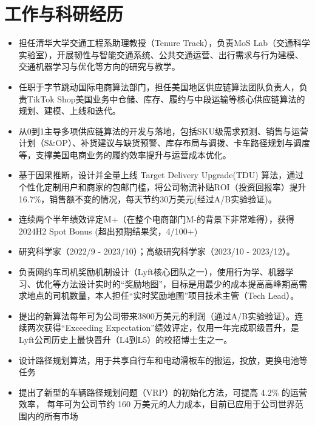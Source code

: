 
\section{工作与科研经历}
\begin{itemize}[parsep=0.5ex]
  \item 担任清华大学交通工程系助理教授（Tenure Track），负责MoS Lab（交通科学实验室），开展韧性与智能交通系统、公共交通运营、出行需求与行为建模、交通机器学习与优化等方向的研究与教学。
\end{itemize}
\begin{itemize}[parsep=0.5ex]
  \item 任职于字节跳动国际电商算法部门，担任美国地区供应链算法团队负责人，负责TikTok Shop美国业务中仓储、库存、履约与中段运输等核心供应链算法的规划、建模、上线和迭代。
  \item 从0到1主导多项供应链算法的开发与落地，包括SKU级需求预测、销售与运营计划（S\&OP）、补货建议与缺货预警、库存布局与调拨、卡车路径规划与调度等，支撑美国电商业务的履约效率提升与运营成本优化。
  \item 基于因果推断，设计并全量上线 Target Delivery Upgrade(TDU) 算法，通过个性化定制用户和商家的包邮门槛，将公司物流补贴ROI（投资回报率）提升16.7\%，销售额不变的情况，每天节约30万美元(经过A/B实验验证)。
  \item 连续两个半年绩效评定M+（在整个电商部门M-的背景下非常难得），获得2024H2 Spot Bonus (超出预期结果奖，4/100+)
\end{itemize}
\begin{itemize}[parsep=0.5ex]
  \item 研究科学家（2022/9 - 2023/10）；高级研究科学家（2023/10 - 2023/12）。
  \item 负责网约车司机奖励机制设计（Lyft核心团队之一），使用行为学、机器学习、优化等方法设计实时的“奖励地图”，目标是用最少的成本提高高峰期高需求地点的司机数量，本人担任“实时奖励地图”项目技术主管（Tech Lead）。
  \item 提出的新算法每年可为公司带来3800万美元的利润（通过A/B实验验证）。连续两次获得“Exceeding Expectation”绩效评定，仅用一年完成职级晋升，是Lyft公司历史上最快晋升（L4到L5）的校招博士生之一。
\end{itemize}
\begin{itemize}[parsep=0.5ex]
  \item 设计路径规划算法，用于共享自行车和电动滑板车的搬运，投放，更换电池等任务
  \item 提出了新型的车辆路径规划问题（VRP）的初始化方法，可提高 4.2\% 的运营效率，
每年可为公司节约 160 万美元的人力成本，目前已应用于公司世界范围内的所有市场
\end{itemize}
